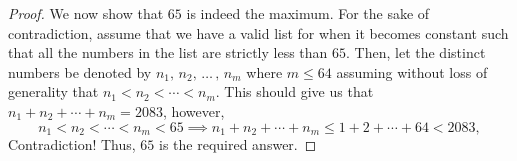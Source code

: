 \documentclass[11pt]{scrartcl}
\begin{document}
\begin{proof}
    We now show that $65$ is indeed the maximum. For the sake of contradiction,
    assume that we have a valid list for when it becomes constant such that all
    the numbers in the list are strictly less than $65$. Then, let the distinct numbers be 
    denoted by $n_1, \, n_2, \, \dots \,, \, n_{m}$ where $m \le 64$ assuming without loss 
    of generality that $n_1 < n_2 < \cdots < n_{m}$. This should give us that 
    $n_1 + n_2 + \cdots + n_{m} = 2083$, however,
    \[
    n_1 < n_2 < \cdots < n_{m} < 65 \implies
    n_1 + n_2 + \cdots + n_{m} \le 1 + 2 + \cdots + 64 < 2083,
    \]
    Contradiction! Thus, $65$ is the required answer.
\end{proof}
\end{document}
